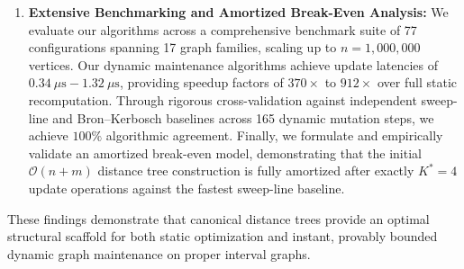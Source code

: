 \begin{enumerate}[label=\textbf{(\arabic*)}]
    \item \textbf{Extensive Benchmarking and Amortized Break-Even Analysis:}
    We evaluate our algorithms across a comprehensive benchmark suite of 77 configurations spanning 17 graph families, scaling up to $n = 1,000,000$ vertices. Our dynamic maintenance algorithms achieve update latencies of $0.34\ \mu\text{s} - 1.32\ \mu\text{s}$, providing speedup factors of $370\times$ to $912\times$ over full static recomputation. Through rigorous cross-validation against independent sweep-line and Bron--Kerbosch baselines across 165 dynamic mutation steps, we achieve $100\%$ algorithmic agreement. Finally, we formulate and empirically validate an amortized break-even model, demonstrating that the initial $\mathcal{O}(n+m)$ distance tree construction is fully amortized after exactly $K^* = 4$ update operations against the fastest sweep-line baseline.
\end{enumerate}

These findings demonstrate that canonical distance trees provide an optimal structural scaffold for both static optimization and instant, provably bounded dynamic graph maintenance on proper interval graphs.

\clearpage


\tableofcontents
\clearpage

\listoffigures
\clearpage

\listoftables
\clearpage


